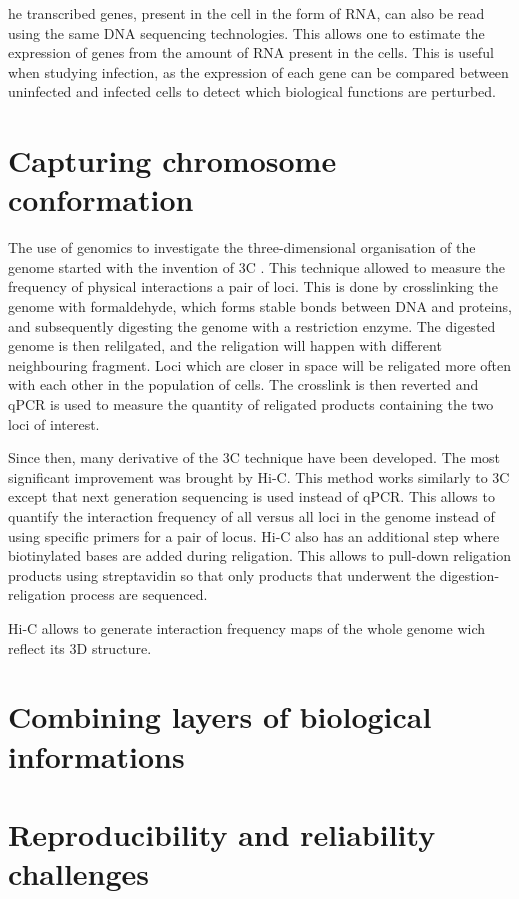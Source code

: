 he transcribed genes, present in the cell in the form of RNA, can also be read using the same DNA sequencing technologies. This allows one to estimate the expression of genes from the amount of RNA present in the cells. This is useful when studying infection, as the expression of each gene can be compared between uninfected and infected cells to detect which biological functions are perturbed.



\section{Capturing chromosome conformation}

The use of genomics to investigate the three-dimensional organisation of the genome started with the invention of \acrfull{3C} \cite{Dekker2002}. This technique allowed to measure the frequency of physical interactions a pair of loci. This is done by crosslinking the genome with formaldehyde, which forms stable bonds between DNA and proteins, and subsequently digesting the genome with a restriction enzyme. The digested genome is then relilgated, and the religation will happen with different neighbouring fragment. Loci which are closer in space will be religated more often with each other in the population of cells. The crosslink is then reverted and qPCR is used to measure the quantity of religated products containing the two loci of interest. 

Since then, many derivative of the \acrshort{3C} technique have been developed. The most significant improvement was brought by Hi-C. This method works similarly to 3C except that next generation sequencing is used instead of qPCR. This allows to quantify the interaction frequency of all versus all loci in the genome instead of using specific primers for a pair of locus. Hi-C also has an additional step where biotinylated bases are added during religation. This allows to pull-down religation products using streptavidin so that only products that underwent the digestion-religation process are sequenced.

Hi-C allows to generate interaction frequency maps of the whole genome wich reflect its 3D structure.

\section{Combining layers of biological informations}

\section{Reproducibility and reliability challenges}
